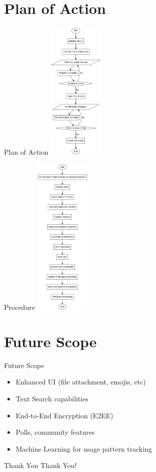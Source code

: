 \documentclass{beamer}
\begin{document}
\section{Plan of Action}
\begin{frame}{Plan of Action}
    \centering
    \includegraphics[width=0.2\textwidth]{Graphviz files/Images/graph.png}
\end{frame}

\begin{frame}{Procedure}
    \centering
    \includegraphics[width=0.2\textwidth]{Graphviz files/Images/implementation.png}
\end{frame}

\section{Future Scope}
\begin{frame}{Future Scope}
    \begin{itemize}
        \item Enhanced UI (file attachment, emojis, etc)
        \item Text Search capabilities
        \item End-to-End Encryption (E2EE)
        \item Polls, community features
        \item Machine Learning for usage pattern tracking
    \end{itemize}
\end{frame}


\begin{frame}{Thank You}
    \centering
    \Huge Thank You!
\end{frame}
\end{document}
